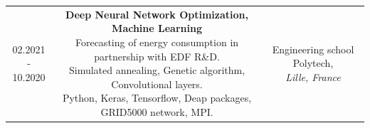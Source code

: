 \documentclass[a4paper]{article}
\begin{document}
\begin{titlepage}
\begin{tabular}{ccc}
\\

\parbox[]{0.11\linewidth}{02.2021 -\\ 10.2020\\} 
&
\parbox[]{0.59\linewidth}{\textbf{\large Deep Neural Network Optimization, Machine Learning}\\
Forecasting of energy consumption in partnership with EDF R\&D.\\
Simulated annealing, Genetic algorithm, Convolutional layers.\\
Python, Keras, Tensorflow, Deap packages, GRID5000 network, MPI.\\}
&
\parbox[]{0.3\linewidth}{Engineering school Polytech,\\ \textit{Lille, France}\\}
\end{tabular}

\medskip


\end{titlepage}
\end{document}
